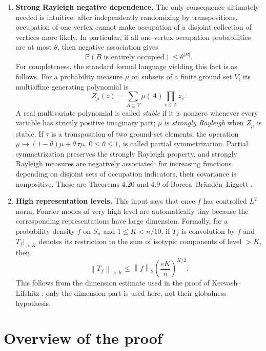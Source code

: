 \documentclass[11pt]{article}
\numberwithin{equation}{section}
\theoremstyle{definition}\newtheorem{definition}[theorem]{Definition}
\theoremstyle{remark}\newtheorem{remark}[theorem]{Remark}
\newcommand{\Prb}{\mathbb P}
\newcommand{\norm}[1]{\left\lVert#1\right\rVert}
\begin{document}
\begin{enumerate}[label=(E\arabic*)]
\item \textbf{Strong Rayleigh negative dependence.}
The only consequence ultimately needed is intuitive: after independently
randomizing by transpositions, occupation of one vertex cannot make occupation
of a disjoint collection of vertices more likely.  In particular, if all
one-vertex occupation probabilities are at most $\theta$, then negative
association gives
\[
 \Prb(B\text{ is entirely occupied})\le\theta^{|B|}.
\]
For completeness, the standard formal language yielding this fact is as
follows.  For a probability measure $\mu$ on subsets of a finite ground set
$V$, its multiaffine generating polynomial is
\[
 Z_\mu(z)=\sum_{A\subseteq V}\mu(A)\prod_{v\in A}z_v.
\]
A real multivariate polynomial is called \emph{stable} if it is nonzero
whenever every variable has strictly positive imaginary part; $\mu$ is
\emph{strongly Rayleigh} when $Z_\mu$ is stable.  If $\tau$ is a
transposition of two ground-set elements, the operation
$\mu\mapsto(1-\theta)\mu+\theta\,\tau\mu$, $0\le\theta\le1$, is
called partial symmetrization.  Partial symmetrization preserves the strongly
Rayleigh property, and strongly Rayleigh measures are negatively associated:
for increasing functions depending on disjoint sets of occupation indicators,
their covariance is nonpositive.  These are Theorems 4.20 and 4.9 of
Borcea--Br\"and\'en--Liggett \cite{BorceaBrandenLiggett2009}.

\item \textbf{High representation levels.}
This input says that once $f$ has controlled $L^2$ norm, Fourier modes of very
high level are automatically tiny because the corresponding representations
have large dimension.  Formally, for a probability density $f$ on $S_n$ and
$1\le K<n/10$, if $T_f$ is
convolution by $f$ and $T_f|_{>K}$ denotes its restriction to the sum of
isotypic components of level $>K$, then
\begin{equation}\label{eq:external-high-level}
 \norm{T_f}_{>K}\le \norm f_2\left(\frac{eK}{n}\right)^{K/2}.
\end{equation}
This follows from the dimension estimate used in the proof of
Keevash--Lifshitz \cite[Theorem 4.4 and Lemma 4.5]{KeevashLifshitz2023}; only
the dimension part is used here, not their globalness hypothesis.
\end{enumerate}

\section{Overview of the proof}\label{sec:overview}
\end{document}
